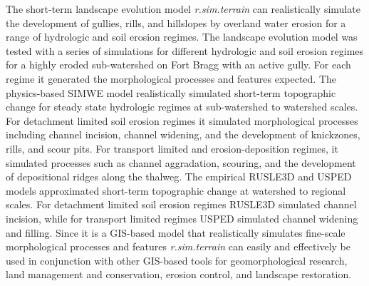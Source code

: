 \documentclass[esurf, manuscript]{copernicus}
\begin{document}
The short-term landscape evolution model 
\emph{r.sim.terrain} 
can realistically simulate the development of 
gullies, rills, and hillslopes by overland water erosion
for a range of hydrologic and soil erosion regimes.
The landscape evolution model was tested
with a series of simulations for different 
hydrologic and soil erosion regimes
for a highly eroded sub-watershed on Fort Bragg
with an active gully.
For each regime it generated the 
morphological processes and features expected.
The physics-based SIMWE model 
realistically simulated short-term topographic change
for steady state hydrologic regimes
at sub-watershed to watershed scales. 
For detachment limited soil erosion regimes
it simulated morphological processes including
channel incision, channel widening, and 
the development of knickzones, rills, and scour pits.
For transport limited and erosion-deposition regimes,
it simulated processes such as channel aggradation,
scouring, and the development of
depositional ridges along the thalweg.
The empirical RUSLE3D and USPED models
approximated short-term topographic change
at watershed to regional scales. 
For detachment limited soil erosion regimes 
RUSLE3D simulated channel incision,
while for transport limited regimes
USPED simulated channel widening and filling. 
Since it is a GIS-based model 
that realistically simulates 
fine-scale morphological processes and features
\emph{r.sim.terrain} can easily and effectively be used 
in conjunction with other GIS-based tools
for geomorphological research,
land management and conservation,
erosion control, and landscape restoration. 


\end{document}
